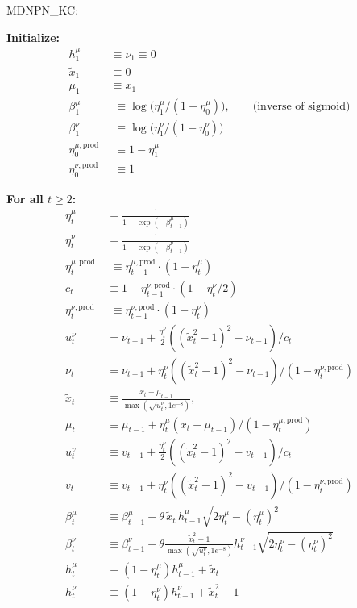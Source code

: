 \documentclass{article}
\begin{document}
	{\large MDNPN\_KC:}
	
	\medskip
	
	
	
	\textbf{Initialize:}
	\begin{align*}
		h_1^\mu &\equiv  \nu_1  \equiv0 \\
		\tilde{x}_1 & \equiv 0 \\
		\mu_1 &\equiv x_1\\
		{\beta_1^\mu} \,&\,\,  { \equiv \log\big(\eta_1^\mu/(1-\eta_0^\mu)\big) , \qquad\textrm{(inverse of sigmoid)}} \\
		{\beta_1^\nu} \,&\,\,  {\equiv \log\big(\eta_1^\nu/(1-\eta_0^\nu)\big)} \\
		{\eta^{\mu, \mathrm{prod}}_0} \,&\,\,{ \equiv 1-\eta^\mu_1}\\
		{\eta^{\nu, \mathrm{prod}}_0} \,&\,\,{ \equiv 1}
	\end{align*}
	
	\textbf{For all $t \geq 2$:}
	\begin{align}
		\eta_t^\mu  &\equiv \frac{1}{1 + \exp(-\beta_{t-1}^\mu)} \\
		\eta_t^\nu  &\equiv \frac{1}{1 + \exp(-\beta_{t-1}^\nu)} \\
		{\eta^{\mu, \mathrm{prod}}_t} \,&\,\,{\equiv \eta^{\mu, \mathrm{prod}}_{t-1} \cdot (1 - \eta_{t}^\mu)} \\
		c_t & \equiv 1-\eta^{\nu, \mathrm{prod}}_{t-1} \cdot (1 - \eta_{t}^\nu/2)\\
		{\eta^{\nu, \mathrm{prod}}_t} \,&\,\,{\equiv \eta^{\nu, \mathrm{prod}}_{t-1} \cdot (1 - \eta_{t}^\nu)} \\
		u^\nu_t &= \nu_{t-1} + \frac{\eta_{t}^\nu}2 \left( \left( \tilde{x}_t^2 - 1 \right)^2 - \nu_{t-1} \right) { / c_t}\\
		\nu_t &= \nu_{t-1} + \eta_{t}^\nu \left( \left( \tilde{x}_t^2 - 1 \right)^2 - \nu_{t-1} \right) { / (1 - \eta^{\nu, \mathrm{prod}}_t)}\\
		\tilde{x}_t &\equiv \frac{x_t -\mu_{t-1}}{\max\left( \sqrt{u^\nu_t}, 1e^{-8} \right)}, \\
		\mu_t &\equiv \mu_{t-1} + \eta_{t}^\mu (x_t - \mu_{t-1}) {/(1 - \eta^{\mu, \mathrm{prod}}_{t})} \\
		u^v_t &\equiv v_{t-1} + \frac{\eta_t^ \nu}2 \left(\left(\tilde{x}_t^2-1\right)^2 - v_{t-1}\right) { / c_t}  \\
		v_t &\equiv v_{t-1} + \eta_t^ \nu \left(\left(\tilde{x}_t^2-1\right)^2 - v_{t-1}\right) { / (1 - \eta^{\nu, \mathrm{prod}}_t)}  \\
		\beta_t^\mu &\equiv \beta_{t-1}^\mu + \theta\, \tilde{x}_t\, h_{t-1}^\mu \sqrt{2 \eta_{t}^\mu - (\eta_{t}^\mu)^2} \\
		\beta_t^\nu &\equiv \beta_{t-1}^\nu + \theta \frac{\tilde{x}_t^2 - 1}{\max\left( \sqrt{u^v_t }, 1e^{-8} \right)} h_{t-1}^\nu \sqrt{2 \eta_{t}^\nu - (\eta_{t}^\nu)^2} \\
		h_t^\mu &\equiv (1 - \eta_{t}^\mu) h_{t-1}^\mu + \tilde{x}_t \\
		h_t^\nu &\equiv (1 - \eta_{t}^\nu) h_{t-1}^\nu + \tilde{x}_t^2 -1
	\end{align}
	
	
	
	
	
	
\end{document}
